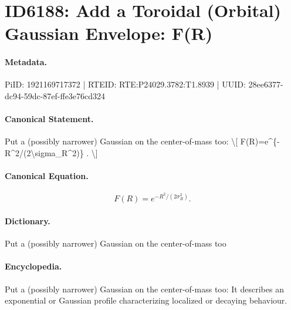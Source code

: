 \section*{ID6188: Add a Toroidal (Orbital) Gaussian Envelope: F(R)}
\paragraph{Metadata.}
PiID: 1921169717372 | RTEID: RTE:P24029.3782:T1.8939 | UUID: 28ee6377-dc94-59dc-87ef-ffe3e76cd324

\paragraph{Canonical Statement.}
Put a (possibly narrower) Gaussian on the center-of-mass too: \textbackslash{}[ F(R)=e\textasciicircum{}\{-R\textasciicircum{}2/(2\textbackslash{}sigma\_R\textasciicircum{}2)\} . \textbackslash{}]

\paragraph{Canonical Equation.}
\[
F(R)=e^{-R^2/(2\sigma_R^2)} .
\]

\paragraph{Dictionary.}
Put a (possibly narrower) Gaussian on the center-of-mass too

\paragraph{Encyclopedia.}
Put a (possibly narrower) Gaussian on the center-of-mass too: It describes an exponential or Gaussian profile characterizing localized or decaying behaviour.

